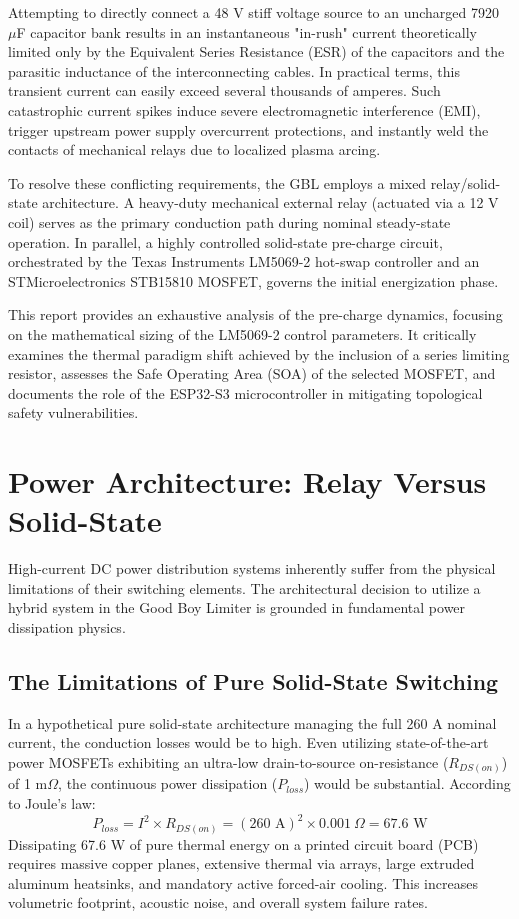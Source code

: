 \documentclass[11pt,a4paper]{article}
\begin{document}
Attempting to directly connect a 48 V stiff voltage source to an uncharged 7920 $\mu$F capacitor bank results in an instantaneous "in-rush" current theoretically limited only by the Equivalent Series Resistance (ESR) of the capacitors and the parasitic inductance of the interconnecting cables. In practical terms, this transient current can easily exceed several thousands of amperes. Such catastrophic current spikes induce severe electromagnetic interference (EMI), trigger upstream power supply overcurrent protections, and instantly weld the contacts of mechanical relays due to localized plasma arcing.

To resolve these conflicting requirements, the GBL employs a mixed relay/solid-state architecture. A heavy-duty mechanical external relay (actuated via a 12 V coil) serves as the primary conduction path during nominal steady-state operation. In parallel, a highly controlled solid-state pre-charge circuit, orchestrated by the Texas Instruments LM5069-2 hot-swap controller and an STMicroelectronics STB15810 MOSFET, governs the initial energization phase.

This report provides an exhaustive analysis of the pre-charge dynamics, focusing on the mathematical sizing of the LM5069-2 control parameters. It critically examines the thermal paradigm shift achieved by the inclusion of a series limiting resistor, assesses the Safe Operating Area (SOA) of the selected MOSFET, and documents the role of the ESP32-S3 microcontroller in mitigating topological safety vulnerabilities.

\section{Power Architecture: Relay Versus Solid-State}

High-current DC power distribution systems inherently suffer from the physical limitations of their switching elements. The architectural decision to utilize a hybrid system in the Good Boy Limiter is grounded in fundamental power dissipation physics.

\subsection{The Limitations of Pure Solid-State Switching}
In a hypothetical pure solid-state architecture managing the full 260 A nominal current, the conduction losses would be to high. Even utilizing state-of-the-art power MOSFETs exhibiting an ultra-low drain-to-source on-resistance ($R_{DS(on)}$) of 1 m$\Omega$, the continuous power dissipation ($P_{loss}$) would be substantial. According to Joule's law:
\begin{equation}
P_{loss} = I^2 \times R_{DS(on)} = (260 \text{ A})^2 \times 0.001\ \Omega = 67.6 \text{ W}
\end{equation}
Dissipating 67.6 W of pure thermal energy on a printed circuit board (PCB) requires massive copper planes, extensive thermal via arrays, large extruded aluminum heatsinks, and mandatory active forced-air cooling. This increases volumetric footprint, acoustic noise, and overall system failure rates. 
\end{document}
